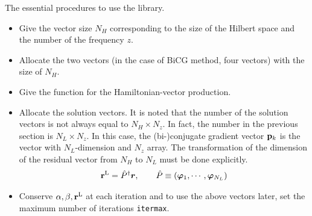 \documentclass[12pt,titlepage]{article}
\begin{document}
The essential procedures to use the library.
\begin{itemize}
\item Give the vector size $N_H$ corresponding to the size of the Hilbert space and the number of the frequency $z$.
\item Allocate the two vectors (in the case of BiCG method, four vectors) with the size of $N_H$.
\item Give the function for the Hamiltonian-vector production.
\item Allocate the solution vectors. It is noted that the number of the solution vectors is not always equal to $N_H \times N_z$. In fact, the number in the previous section is $N_L \times N_z$. 
In this case, the (bi-)conjugate gradient vector ${{\bf p}_k}$ is the vector with $N_L$-dimension and $N_z$ array.
The transformation of the dimension of the residual vector from $N_H$ to $N_L$ must be done explicitly.
  \begin{align}
    {\bf r}^{\rm L} = {\hat P}^\dagger {\boldsymbol r}, \qquad
    {\hat P} \equiv ({\boldsymbol \varphi}_1, \cdots, {\boldsymbol \varphi}_{N_L})
  \end{align}
\item Conserve $\alpha, \beta, {\bf r}^{\rm L}$ at each iteration 
and to use the above vectors later, set the maximum number of iterations \verb|itermax|.
\end{itemize}
\newpage
\end{document}
